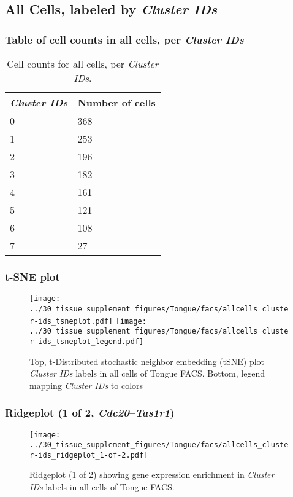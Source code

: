 \clearpage

\subsection{All Cells, labeled by \emph{Cluster IDs}}
\subsubsection{Table of cell counts in all cells, per \emph{Cluster IDs}}\begin{table}[h]
\centering
\label{my-label}
\begin{tabular}{@{}ll@{}}
\toprule

\emph{Cluster IDs}& Number of cells \\ \midrule
0 & 368 \\

1 & 253 \\

2 & 196 \\

3 & 182 \\

4 & 161 \\

5 & 121 \\

6 & 108 \\

7 & 27 \\
\bottomrule
\end{tabular}
\caption{Cell counts for all cells, per \emph{Cluster IDs}.}
\end{table}

\clearpage
\subsubsection{t-SNE plot}
\begin{figure}[h]
\centering
\texttt{[image: ../30\_tissue\_supplement\_figures/Tongue/facs/allcells\_cluster-ids\_tsneplot.pdf]}
\texttt{[image: ../30\_tissue\_supplement\_figures/Tongue/facs/allcells\_cluster-ids\_tsneplot\_legend.pdf]}
\caption{Top, t-Distributed stochastic neighbor embedding (tSNE) plot  \emph{Cluster IDs} labels in all cells of Tongue FACS. Bottom, legend mapping \emph{Cluster IDs} to colors}
\end{figure}


\clearpage

\subsubsection{Ridgeplot (1 of 2, \emph{Cdc20}--\emph{Tas1r1})}
\begin{figure}[h]
\centering
\texttt{[image: ../30\_tissue\_supplement\_figures/Tongue/facs/allcells\_cluster-ids\_ridgeplot\_1-of-2.pdf]}

\caption{ Ridgeplot (1 of 2)  showing gene expression enrichment in \emph{Cluster IDs} labels in all cells of Tongue FACS. }
\end{figure}


